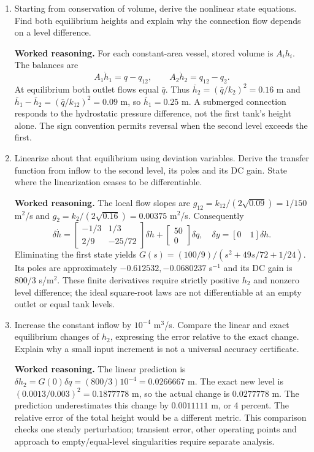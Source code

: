 \documentclass[10pt,a4paper]{article}
\newcommand{\answer}{\par\smallskip\textbf{Worked reasoning.} }
\begin{document}
\begin{enumerate}
\item Starting from conservation of volume, derive the nonlinear state equations. Find both equilibrium heights and explain why the connection flow depends on a level difference.
\answer For each constant-area vessel, stored volume is $A_i h_i$. The balances are
\[
A_1\dot h_1=q-q_{12},\qquad A_2\dot h_2=q_{12}-q_2.
\]
At equilibrium both outlet flows equal $\bar q$. Thus $\bar h_2=(\bar q/k_2)^2=0.16$ m and $\bar h_1-\bar h_2=(\bar q/k_{12})^2=0.09$ m, so $\bar h_1=0.25$ m. A submerged connection responds to the hydrostatic pressure difference, not the first tank's height alone. The sign convention permits reversal when the second level exceeds the first.
\item Linearize about that equilibrium using deviation variables. Derive the transfer function from inflow to the second level, its poles and its DC gain. State where the linearization ceases to be differentiable.
\answer The local flow slopes are $g_{12}=k_{12}/(2\sqrt{0.09})=1/150$ m$^2$/s and $g_2=k_2/(2\sqrt{0.16})=0.00375$ m$^2$/s. Consequently
\[
\delta\dot h=\begin{bmatrix}-1/3&1/3\\2/9&-25/72\end{bmatrix}\delta h+
\begin{bmatrix}50\\0\end{bmatrix}\delta q,\quad
\delta y=[0\quad1]\delta h.
\]
Eliminating the first state yields $G(s)=(100/9)/(s^2+49s/72+1/24)$. Its poles are approximately $-0.612532,-0.0680237$ s$^{-1}$ and its DC gain is $800/3$ s/m$^2$. These finite derivatives require strictly positive $h_2$ and nonzero level difference; the ideal square-root laws are not differentiable at an empty outlet or equal tank levels.
\item Increase the constant inflow by $10^{-4}$ m$^3$/s. Compare the linear and exact equilibrium changes of $h_2$, expressing the error relative to the exact change. Explain why a small input increment is not a universal accuracy certificate.
\answer The linear prediction is $\delta h_2=G(0)\delta q=(800/3)10^{-4}=0.0266667$ m. The exact new level is $(0.0013/0.003)^2=0.1877778$ m, so the actual change is $0.0277778$ m. The prediction underestimates this change by $0.0011111$ m, or 4 percent. The relative error of the total height would be a different metric. This comparison checks one steady perturbation; transient error, other operating points and approach to empty/equal-level singularities require separate analysis.

\end{enumerate}
\end{document}
